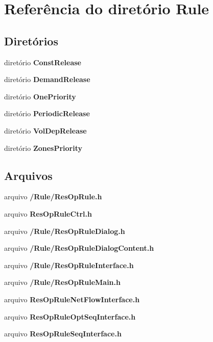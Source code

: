 \section{Referência do diretório Rule}
\label{dir_aae538a3ba11b8480265c390afd47a8c}
\subsection*{Diretórios}
\begin{DoxyCompactItemize}
\item 
diretório {\bf Const\+Release}
\item 
diretório {\bf Demand\+Release}
\item 
diretório {\bf One\+Priority}
\item 
diretório {\bf Periodic\+Release}
\item 
diretório {\bf Vol\+Dep\+Release}
\item 
diretório {\bf Zones\+Priority}
\end{DoxyCompactItemize}
\subsection*{Arquivos}
\begin{DoxyCompactItemize}
\item 
arquivo {\bf /\+Rule/\+Res\+Op\+Rule.\+h}
\item 
arquivo {\bf Res\+Op\+Rule\+Ctrl.\+h}
\item 
arquivo {\bf /\+Rule/\+Res\+Op\+Rule\+Dialog.\+h}
\item 
arquivo {\bf /\+Rule/\+Res\+Op\+Rule\+Dialog\+Content.\+h}
\item 
arquivo {\bf /\+Rule/\+Res\+Op\+Rule\+Interface.\+h}
\item 
arquivo {\bf /\+Rule/\+Res\+Op\+Rule\+Main.\+h}
\item 
arquivo {\bf Res\+Op\+Rule\+Net\+Flow\+Interface.\+h}
\item 
arquivo {\bf Res\+Op\+Rule\+Opt\+Seq\+Interface.\+h}
\item 
arquivo {\bf Res\+Op\+Rule\+Seq\+Interface.\+h}
\end{DoxyCompactItemize}
